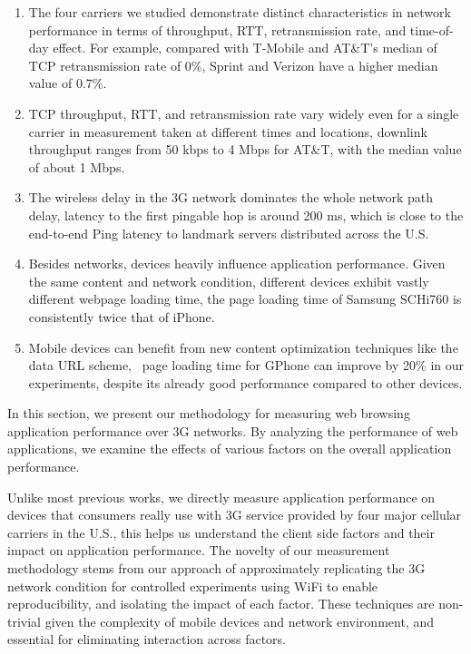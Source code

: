 \begin{enumerate}%

\item The four carriers we studied demonstrate distinct 
characteristics in network performance in terms of throughput, RTT, 
retransmission rate, and time-of-day effect. For example, compared 
with T-Mobile and AT\&T's median of TCP retransmission rate of 
0\%, Sprint and Verizon have a higher median value of 0.7\%. 

\item TCP throughput, RTT, and retransmission rate vary widely even
for a single carrier in measurement taken at different times and 
locations, \eg downlink throughput ranges from 50 kbps to 4 Mbps for 
AT\&T, with the median value of about 1 Mbps.

\item The wireless delay in the 3G network dominates the whole
network path delay, \eg latency to the first pingable hop is around 
200 ms, which is close to the end-to-end Ping latency to landmark
servers distributed across the U.S.

\item Besides networks, devices heavily influence application 
performance. Given the same content and network condition, different 
devices exhibit vastly different webpage loading time, \eg the
page loading time of Samsung SCHi760 is consistently twice that of 
iPhone. 

\item Mobile devices can benefit from new content optimization
techniques like the data URL scheme, \eg~page loading time for 
GPhone can improve by 20\% in our experiments, despite 
its already good performance compared to other devices.
\end{enumerate}

\label{sec:app.method}

In this section, we present our methodology for measuring web browsing application performance over 3G networks. By analyzing the performance of web applications, we examine the effects of various factors on the overall application performance.

Unlike most previous works, we directly measure application 
performance on devices that consumers really use with 3G service 
provided by four major cellular carriers in the U.S., this helps us 
understand the client side factors and their impact on application 
performance. The novelty of our measurement methodology stems from 
our approach of approximately replicating the 3G network condition 
for controlled experiments using WiFi to enable reproducibility, 
and isolating the impact of each factor. These techniques are 
non-trivial given the complexity of mobile devices and network 
environment, and essential for eliminating interaction across factors. 


